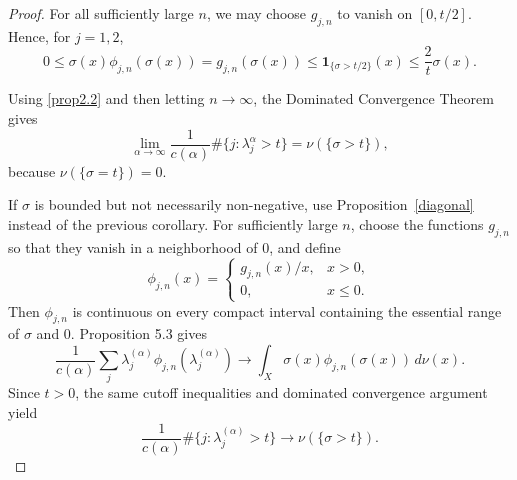 \documentclass{amsart}
\theoremstyle{definition}
\theoremstyle{remark}
\numberwithin{equation}{section}
\begin{document}
\begin{proof}
For all sufficiently large $n$, we may choose $g_{j,n}$ to vanish on
$[0,t/2]$. Hence, for $j=1,2$,
\[
0\leq \sigma(x)\phi_{j,n}(\sigma(x))
 =g_{j,n}(\sigma(x))
 \leq \mathbf{1}_{\{\sigma>t/2\}}(x)
 \leq \frac{2}{t}\sigma(x).
\]

Using \eqref{prop2.2} and then letting $n\to\infty$, the Dominated Convergence Theorem gives
\[
\lim_{\alpha\to\infty}
\frac{1}{c(\alpha)}
\#\{j:\lambda_j^\alpha>t\}
=
\nu(\{\sigma>t\}),
\]
because $\nu(\{\sigma=t\})=0$.

If \(\sigma\) is bounded but not necessarily non-negative, use
Proposition~\ref{diagonal} instead of the previous corollary. For sufficiently large \(n\),
choose the functions \(g_{j,n}\) so that they vanish in a neighborhood
of \(0\), and define
\[
\phi_{j,n}(x)=
\begin{cases}
g_{j,n}(x)/x, & x>0,\\
0, & x\le 0.
\end{cases}
\]
Then \(\phi_{j,n}\) is continuous on every compact interval containing
the essential range of \(\sigma\) and \(0\). Proposition 5.3 gives
\[
\frac{1}{c(\alpha)}
\sum_j \lambda_j^{(\alpha)}
\phi_{j,n}(\lambda_j^{(\alpha)})
\longrightarrow
\int_X \sigma(x)\phi_{j,n}(\sigma(x))\,d\nu(x).
\]
Since \(t>0\), the same cutoff inequalities and dominated convergence
argument yield
\[
\frac{1}{c(\alpha)}
\#\{j:\lambda_j^{(\alpha)}>t\}
\longrightarrow
\nu(\{\sigma>t\}).
\]
\end{proof}  




\end{document}
